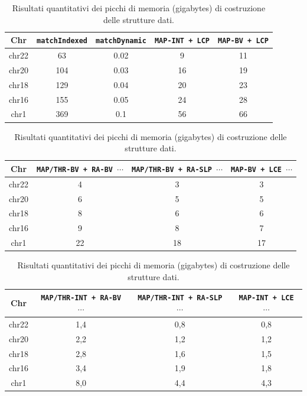 \begin{table}
  \centering
  \caption{Risultati quantitativi dei picchi di memoria (gigabytes) di costruzione delle
    strutture dati.} 
  \label{tab:exemem}
  \footnotesize
  \begin{tabular}{c||c|c|c|c} 
    \textbf{Chr}
    & \textbf{\texttt{matchIndexed}}
    & \textbf{\texttt{matchDynamic}}
    & \textbf{\texttt{MAP-INT \newline+ LCP}}
    & \textbf{\texttt{MAP-BV \newline+ LCP}}\\
    \hline
    \hline
    chr22 & 63 & 0.02 & 9 & 11 \\
    chr20 & 104 & 0.03 & 16 & 19 \\
    chr18 & 129 & 0.04 & 20 & 23 \\
    chr16 & 155 & 0.05 & 24 & 28 \\
    chr1 & 369 & 0.1 & 56 & 66 
  \end{tabular}
  \vspace{+3mm}
  \vspace{+1mm}
  \begin{tabular}{c||c|c|c} 
    \textbf{Chr}
    & \textbf{\texttt{MAP/THR-BV + RA-BV $\cdots$}}
    & \textbf{\texttt{MAP/THR-BV + RA-SLP $\cdots$}}
    & \textbf{\texttt{MAP-BV + LCE $\cdots$}}\\
    \hline
    \hline
    chr22 & 4 & 3 & 3  \\
    chr20 & 6 & 5 & 5 \\
    chr18 & 8 & 6 & 6 \\
    chr16 & 9 & 8 & 7 \\
    chr1 & 22 & 18 & 17 
  \end{tabular}
  \vspace{+3mm}
  \vspace{+1mm}
  \begin{tabular}{c||c|c|c} 
    \textbf{Chr}
    & \textbf{\texttt{MAP/THR-INT + RA-BV $\cdots$}}
    & \textbf{\texttt{MAP/THR-INT + RA-SLP $\cdots$}}
    & \textbf{\texttt{MAP-INT + LCE $\cdots$}}\\
    \hline
    \hline

    chr22 & 1,4 & 0,8 & 0,8 \\
    chr20 & 2,2 & 1,2 & 1,2 \\
    chr18 & 2,8 & 1,6 & 1,5 \\
    chr16 & 3,4 & 1,9 & 1,8 \\
    chr1 & 8,0 & 4,4 & 4,3 

                                                                        
  \end{tabular}
\end{table}


